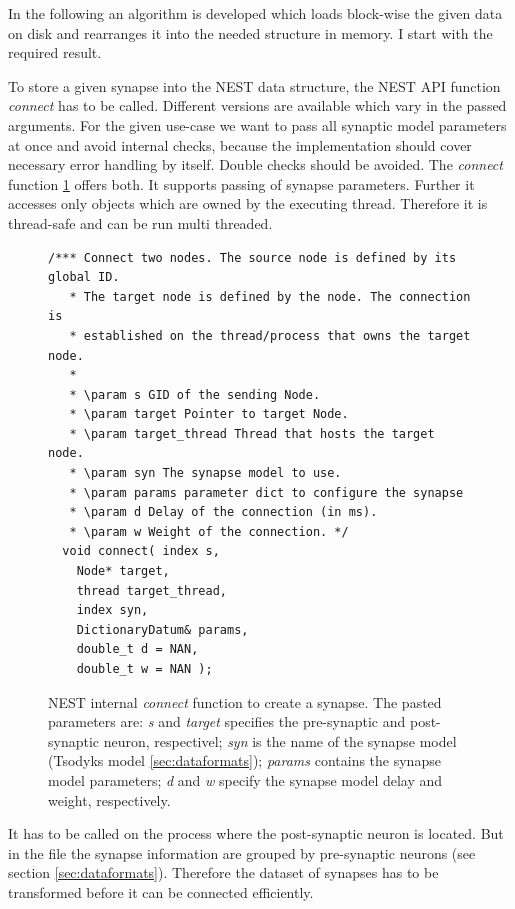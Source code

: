 In the following an algorithm is developed which loads block-wise the given data on disk and rearranges it into
the needed structure in memory. I start with the required result.

To store a given synapse into the NEST data structure,
the NEST API function \emph{connect} has to be called.  
Different versions are available which vary in the passed arguments.
For the given use-case we want to pass all synaptic model parameters at once and
avoid internal checks, because the implementation should cover necessary error handling by 
itself. Double checks should be avoided.
The \emph{connect} function \ref{code:connect} offers both.
It supports passing of synapse parameters.
Further it accesses only objects which are owned by the executing thread. 
Therefore it is thread-safe and can be run multi threaded.
\begin{figure}[ht!]
\begin{lstlisting}[style=cppcode]
/*** Connect two nodes. The source node is defined by its global ID.
   * The target node is defined by the node. The connection is
   * established on the thread/process that owns the target node.
   *
   * \param s GID of the sending Node.
   * \param target Pointer to target Node.
   * \param target_thread Thread that hosts the target node.
   * \param syn The synapse model to use.
   * \param params parameter dict to configure the synapse
   * \param d Delay of the connection (in ms).
   * \param w Weight of the connection. */
  void connect( index s,
    Node* target,
    thread target_thread,
    index syn,
    DictionaryDatum& params,
    double_t d = NAN,
    double_t w = NAN );
\end{lstlisting}
\caption{NEST internal \emph{connect} function to create a synapse. The pasted parameters are:
\emph{s} and \emph{target} specifies the pre-synaptic and post-synaptic neuron, respectivel;
\emph{syn} is the name of the synapse model (Tsodyks model \ref{sec:dataformats});
\emph{params} contains the synapse model parameters;
\emph{d} and \emph{w} specify the synapse model delay and weight, respectively.}
\label{code:connect}
\end{figure}
It has to be called on the process where the post-synaptic neuron is located.
But in the file the synapse information are grouped by pre-synaptic neurons (see section \ref{sec:dataformats}).
Therefore the dataset of synapses has to be transformed before it can be connected efficiently.
